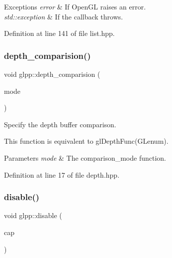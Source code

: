 \begin{DoxyExceptions}{Exceptions}
{\em error} & If Open\+GL raises an error. \\
\hline
{\em std\+::exception} & If the callback throws. \\
\hline
\end{DoxyExceptions}


Definition at line 141 of file list.\+hpp.

\mbox{\label{namespaceglpp_ac6b2c7dc6e9ed88cc51a099ddb9169fc}} 
\subsubsection{\texorpdfstring{depth\+\_\+comparision()}{depth\_comparision()}}
{\footnotesize\ttfamily void glpp\+::depth\+\_\+comparision (\begin{DoxyParamCaption}\item[{\hyperlink{namespaceglpp_aa44c8e6b80225228552f747c73ba7186}{comparision\+\_\+mode}}]{mode }\end{DoxyParamCaption})\hspace{0.3cm}{\ttfamily [inline]}}



Specify the depth buffer comparison. 

This function is equivalent to gl\+Depth\+Func(\+G\+Lenum).


\begin{DoxyParams}{Parameters}
{\em mode} & The comparison\+\_\+mode function. \\
\hline
\end{DoxyParams}


Definition at line 17 of file depth.\+hpp.

\mbox{\label{namespaceglpp_a02ef6b3510b6a60c01cf0c35a1311a35}} 
\subsubsection{\texorpdfstring{disable()}{disable()}}
{\footnotesize\ttfamily void glpp\+::disable (\begin{DoxyParamCaption}\item[{\hyperlink{namespaceglpp_a1b0f7d2f17d11ae11a12d44571612832}{capability}}]{cap }\end{DoxyParamCaption})\hspace{0.3cm}{\ttfamily [inline]}}



